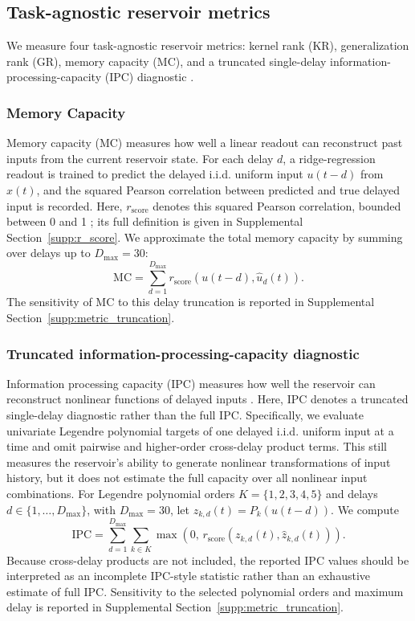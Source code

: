 \documentclass[a4paper,fleqn]{style_neural_networks/cas-dc}
\let\parencite\citep
\begin{document}
\subsection{Task-agnostic reservoir metrics}
We measure four task-agnostic reservoir metrics: kernel rank (KR), generalization rank (GR), memory capacity (MC), and a truncated single-delay information-processing-capacity (IPC) diagnostic \parencite{maass_comp_power_2004,legenstein_maass_2007,busing_connectivity_2010,Jaeger2002STMESN,dambre_ipc_2012,pilati_ceni_michieletti_gallicchio_ricciardi_milano_2026}.

\subsubsection{Memory Capacity}
Memory capacity (MC) measures how well a linear readout can reconstruct past inputs from the current reservoir state. For each delay \(d\), a ridge-regression readout is trained to predict the delayed i.i.d. uniform input \(u(t-d)\) from \(x(t)\), and the squared Pearson correlation between predicted and true delayed input is recorded. Here, \(r_{\mathrm{score}}\) denotes this squared Pearson correlation, bounded between 0 and 1 \parencite{Jaeger2002STMESN}; its full definition is given in Supplemental Section~\ref{supp:r_score}. We approximate the total memory capacity by summing over delays up to \(D_{\max}=30\):
\[
\mathrm{MC}
=
\sum_{d=1}^{D_{\max}}
r_{\mathrm{score}}(u(t-d),\hat{u}_d(t)).
\]
The sensitivity of MC to this delay truncation is reported in Supplemental Section~\ref{supp:metric_truncation}.

\subsubsection{Truncated information-processing-capacity diagnostic}
\label{sec:ipc}
Information processing capacity (IPC) measures how well the reservoir can reconstruct nonlinear functions of delayed inputs \parencite{dambre_ipc_2012}. Here, IPC denotes a truncated single-delay diagnostic rather than the full IPC. Specifically, we evaluate univariate Legendre polynomial targets of one delayed i.i.d. uniform input at a time and omit pairwise and higher-order cross-delay product terms. This still measures the reservoir's ability to generate nonlinear transformations of input history, but it does not estimate the full capacity over all nonlinear input combinations. For Legendre polynomial orders \(K=\{1,2,3,4,5\}\) and delays \(d\in\{1,\ldots,D_{\max}\}\), with \(D_{\max}=30\), let \(z_{k,d}(t)=P_k(u(t-d))\). We compute
\[
\mathrm{IPC}
=
\sum_{d=1}^{D_{\max}}
\sum_{k\in K}
\max\!\left(0,\,
r_{\mathrm{score}}\!\left(z_{k,d}(t),\hat{z}_{k,d}(t)\right)
\right).
\]
Because cross-delay products are not included, the reported IPC values should be interpreted as an incomplete IPC-style statistic rather than an exhaustive estimate of full IPC. Sensitivity to the selected polynomial orders and maximum delay is reported in Supplemental Section~\ref{supp:metric_truncation}.
\end{document}
